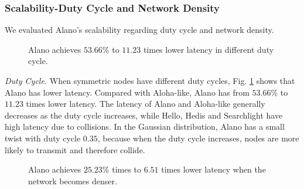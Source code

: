 \subsubsection{Scalability-Duty Cycle and Network Density}

We evaluated Alano's scalability regarding duty cycle and network density.

\begin{figure}[!h]
\centering
{}
\hspace{0.01in}
\caption{Alano achieves $53.66\%$ to $11.23$ times lower latency in different duty cycle.}
\label{fig_dutycycle}
\end{figure}


\emph{Duty Cycle.}
When symmetric nodes have different duty cycles, Fig.
\ref{fig_dutycycle} shows that Alano has lower latency. Compared with
Aloha-like, Alano has from $53.66\%$ to $11.23$ times lower latency. The
latency of Alano and Aloha-like generally decreases as the duty cycle
increases, while Hello, Hedis and Searchlight have high latency due to
collisions. In the Gaussian distribution, Alano has a small twist with
duty cycle $0.35$, because when the duty cycle increases, nodes are more
likely to transmit and therefore collide.


\begin{figure}[!h]
\centering
{}
\hspace{0.01in}
\caption{Alano achieves $25.23\%$ times to $6.51$ times lower latency when the network becomes denser.}
\label{fig_node}
\end{figure}

